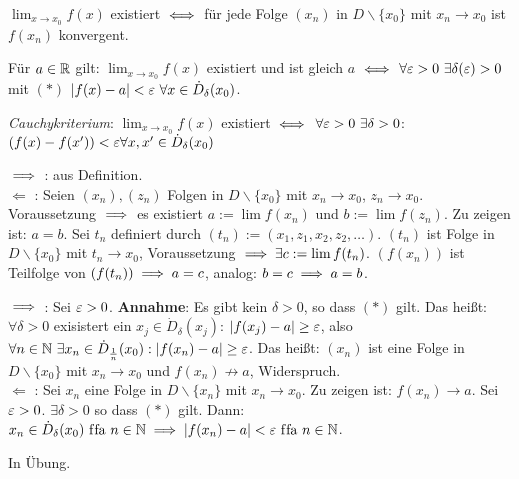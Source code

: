 \documentclass[a4paper,twoside,DIV15,BCOR12mm]{scrbook}
\begin{document}
\begin{satz}
\begin{liste}
\item $\displaystyle\lim_{x\to x_0}f(x)$ existiert $\iff$ für jede Folge $(x_n)$ in $D\backslash\{x_0\}$ mit $x_n \to x_0$ ist $f(x_n)$ konvergent.
\item Für $a\in\mathbb{R}$ gilt: $\displaystyle\lim_{x\to x_0}f(x)$ existiert und ist gleich $a$ $\iff$ $\forall \varepsilon>0 \ \exists \delta(\varepsilon) > 0$ mit $(*)$ $|f(x) - a|< \varepsilon \ \forall x \in \dot D_\delta(x_0)$. 
\item \textit{Cauchykriterium}: $\displaystyle\lim_{x\to x_0} f(x)$ existiert $\iff$ $\forall \varepsilon>0 \ \exists \delta >0$: $(f(x) - f(x'))<\varepsilon \forall x,x' \in \dot D_\delta(x_0)$
\end{liste}
\end{satz}

\begin{beweise}
\item \glqq $\implies$ \grqq: aus Definition. \\
\glqq $\Leftarrow$ \grqq: Seien $(x_n), (z_n)$ Folgen in $D\backslash\{x_0\}$ mit $x_n \to x_0$, $z_n \to x_0$. Voraussetzung $\implies$ es existiert $a := \lim f(x_n)$ und $b := \lim f(z_n)$. Zu zeigen ist: $a=b$. Sei $t_n$ definiert durch $(t_n) := (x_1,z_1,x_2,z_2,\ldots)$. $(t_n)$ ist Folge in $D \backslash\{x_0\}$ mit $t_n\to x_0$, Voraussetzung $\implies  \exists c := \lim f(t_n)$. $(f(x_n))$ ist Teilfolge von $(f(t_n)) \implies a=c$, analog: $b=c \implies a = b$.
\item \glqq $\implies$ \grqq: Sei $\varepsilon > 0$. \textbf{Annahme}: Es gibt kein $\delta > 0$, so dass $(*)$ gilt. Das heißt: $\forall \delta > 0$ exisistert ein $x_j \in \dot D_\delta(x_j)$: $|f(x_j) - a| \ge \varepsilon$, also $\forall n\in\mathbb{N} \ \exists x_n \in \dot D_{\frac{1}{n}}(x_0): |f(x_n) - a|\ge\varepsilon$. Das heißt: $(x_n)$ ist eine Folge in $D \backslash\{x_0\}$ mit $x_n \to x_0$ und $f(x_n) \nrightarrow a$, Widerspruch. \\
\glqq $\Leftarrow$ \grqq: Sei $x_n$ eine Folge in $D \backslash\{x_n\}$ mit $x_n \to x_0$. Zu zeigen ist: $f(x_n) \to a$. Sei $\varepsilon>0$. $\exists \delta > 0$ so dass $(*)$ gilt. Dann: $x_n \in \dot D_\delta(x_0) \text{ f\/fa } n\in\mathbb{N} \implies |f(x_n) - a| < \varepsilon \text{ f\/fa } n\in\mathbb{N}$.
\item In Übung.
\end{beweise}
\end{document}
